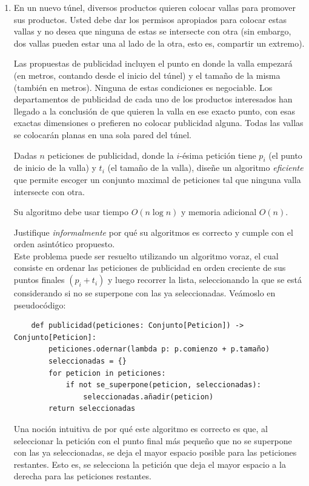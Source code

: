 \documentclass[letterpaper, 12pt]{article}
\begin{document}
\begin{enumerate}


\item  En un nuevo túnel, diversos productos quieren colocar vallas para promover sus productos. Usted debe dar los permisos apropiados para colocar estas vallas y no desea que ninguna de estas se intersecte con otra (sin embargo, dos vallas pueden estar una al lado de la otra, esto es, compartir un extremo).

Las propuestas de publicidad incluyen el punto en donde la valla empezará (en metros, contando desde el inicio del túnel) y el tamaño de la misma (también en metros). Ninguna de estas condiciones es negociable. Los departamentos de publicidad de cada uno de los productos interesados han llegado a la conclusión de que quieren la valla en ese exacto punto, con esas exactas dimensiones o prefieren no colocar publicidad alguna. Todas las vallas se colocarán planas en una sola pared del túnel.

Dadas $n$ peticiones de publicidad, donde la $i$-ésima petición tiene $p_i$ (el punto de inicio de la valla) y $t_i$ (el tamaño de la valla), diseñe un algoritmo \emph{eficiente} que permite escoger un conjunto maximal de peticiones tal que ninguna valla intersecte con otra.

Su algoritmo debe usar tiempo $O(n\log n)$ y memoria adicional $O(n)$.

Justifique \emph{informalmente} por qué su algoritmos es correcto y cumple con el orden asintótico propuesto. \\

Este problema puede ser resuelto utilizando un algoritmo voraz, el cual consiste en ordenar las peticiones de publicidad en orden creciente de sus puntos finales $(p_i + t_i)$ y luego recorrer la lista, seleccionando la que se está considerando si no se superpone con las ya seleccionadas. Veámoslo en pseudocódigo:

\begin{verbatim}
    def publicidad(peticiones: Conjunto[Peticion]) -> Conjunto[Peticion]:
        peticiones.odernar(lambda p: p.comienzo + p.tamaño)
        seleccionadas = {}
        for peticion in peticiones:
            if not se_superpone(peticion, seleccionadas):
                seleccionadas.añadir(peticion)
        return seleccionadas
\end{verbatim}

Una noción intuitiva de por qué este algoritmo es correcto es que, al seleccionar la petición con el punto final más pequeño que no se superpone con las ya seleccionadas, se deja el mayor espacio posible para las peticiones restantes. Esto es, se selecciona la petición que deja el mayor espacio a la derecha para las peticiones restantes.


\end{enumerate}
\end{document}
